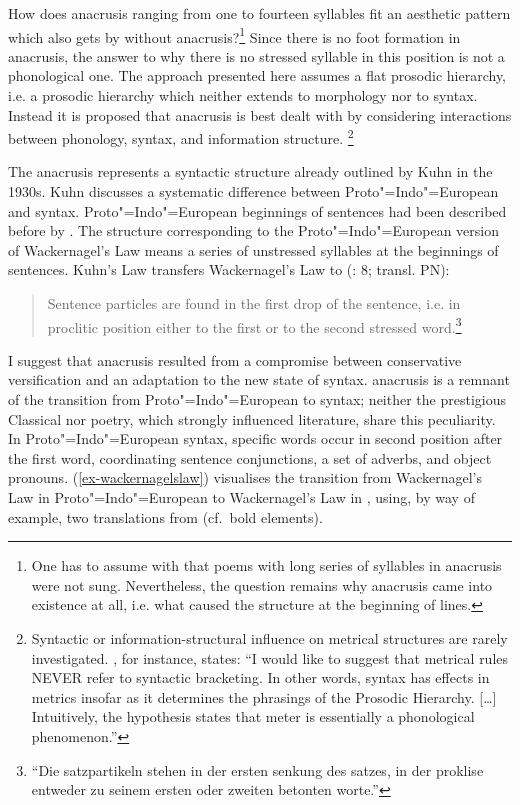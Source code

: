 \documentclass[output=paper
  ,nobabel
  ,uniformtopskip %
]{langscibook}
\begin{document}
\noindent
How does anacrusis ranging from one to fourteen syllables fit an aesthetic pattern which also gets by without anacrusis?\footnote{One has to assume with \citet*[§216]{Heusler1925} that poems with long series of syllables in anacrusis were not sung. Nevertheless, the question remains why anacrusis came into existence at all, i.e. what caused the structure at the beginning of lines.} Since there is no foot formation in anacrusis, the answer to why there is no stressed syllable in this position is not a phonological one. The approach presented here assumes a flat prosodic hierarchy, i.e. a prosodic hierarchy which neither extends to morphology nor to syntax. Instead it is proposed that anacrusis is best dealt with by considering interactions between phonology, syntax, and information structure.%
%
\footnote{Syntactic or information-structural influence on metrical structures are rarely investigated. \citet[224]{Hayes1989}, for instance, states: ``I would like to suggest that metrical rules NEVER refer to syntactic bracketing. In other words, syntax has effects in metrics insofar as it determines the phrasings of the Prosodic Hierarchy. [\ldots] Intuitively, the hypothesis states that meter is essentially a phonological phenomenon.''}

The  anacrusis represents a syntactic structure already outlined by Kuhn in the 1930s. Kuhn discusses a systematic difference between Proto"=Indo"=European and  syntax. Proto"=Indo"=European beginnings of sentences had been described before by \citet{Wackernagel1892}. The  structure corresponding to the Proto"=Indo"=European version of Wackernagel's Law means a series of unstressed syllables at the beginnings of sentences. Kuhn's Law transfers Wackernagel's Law to  (\citealt{Kuhn1933}: 8; transl. PN):

\begin{quote}
Sentence particles are found in the first drop of the sentence, i.e. in proclitic position either to the first or to the second stressed word.\footnote{``{Die satzpartikeln stehen in der ersten senkung des satzes, in der proklise entweder zu seinem ersten oder zweiten betonten worte.''}}
\end{quote}
\largerpage
\noindent
I suggest that  anacrusis resulted from a compromise between conservative versification and
an adaptation to the new state of  syntax.  anacrusis is a remnant of the transition
from Proto"=Indo"=European to  syntax; neither the prestigious Classical  nor  poetry, which strongly influenced  literature, share this peculiarity. In Proto"=Indo"=European syntax, specific words occur in second position after the first word, \eg coordinating sentence conjunctions, a set of adverbs, and object pronouns. (\ref{ex-wackernagelslaw}) visualises the transition from Wackernagel's Law in Proto"=Indo"=European to Wackernagel's Law in , using, by way of example, two translations from  (cf.\ bold elements).
\end{document}
